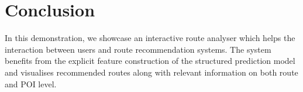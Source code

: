 \section{Conclusion}
In this demonstration, we showcase an interactive route analyser which helps the interaction between users and route recommendation systems. 
The system benefits from the explicit feature construction of the structured prediction model and visualises recommended routes along with relevant information on both route and POI level.
